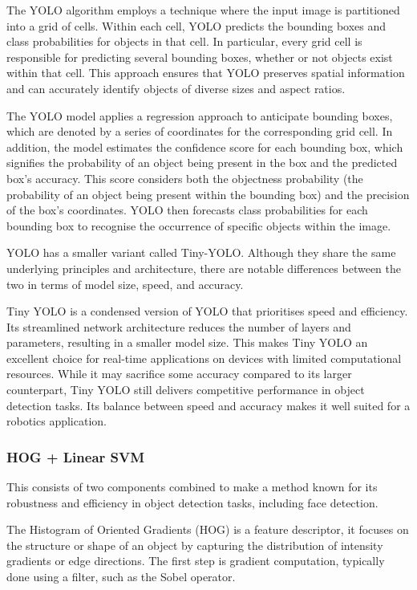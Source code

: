 The YOLO algorithm employs a technique where the input image is partitioned into a grid of cells. Within each cell, YOLO predicts the bounding boxes and class probabilities for objects in that cell. In particular, every grid cell is responsible for predicting several bounding boxes, whether or not objects exist within that cell. This approach ensures that YOLO preserves spatial information and can accurately identify objects of diverse sizes and aspect ratios.

The YOLO model applies a regression approach to anticipate bounding boxes, which are denoted by a series of coordinates for the corresponding grid cell. In addition, the model estimates the confidence score for each bounding box, which signifies the probability of an object being present in the box and the predicted box's accuracy. This score considers both the objectness probability (the probability of an object being present within the bounding box) and the precision of the box's coordinates. YOLO then forecasts class probabilities for each bounding box to recognise the occurrence of specific objects within the image. \cite{Redmon2015-eb}

YOLO has a smaller variant called Tiny-YOLO. Although they share the same underlying principles and architecture, there are notable differences between the two in terms of model size, speed, and accuracy.

Tiny YOLO is a condensed version of YOLO that prioritises speed and efficiency. Its streamlined network architecture reduces the number of layers and parameters, resulting in a smaller model size. This makes Tiny YOLO an excellent choice for real-time applications on devices with limited computational resources. While it may sacrifice some accuracy compared to its larger counterpart, Tiny YOLO still delivers competitive performance in object detection tasks. Its balance between speed and accuracy makes it well suited for a robotics application.

\subsubsection{HOG + Linear SVM}

This consists of two components combined to make a method known for its robustness and efficiency in object detection tasks, including face detection.

The Histogram of Oriented Gradients (HOG) is a feature descriptor, it focuses on the structure or shape of an object by capturing the distribution of intensity gradients or edge directions. The first step is gradient computation, typically done using a filter, such as the Sobel operator.

